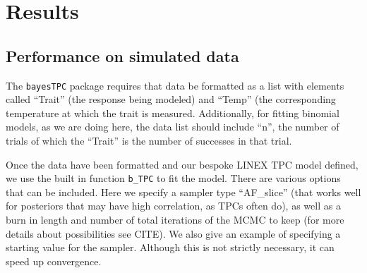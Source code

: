 \documentclass[
]{article}
\newenvironment{Shaded}{\begin{snugshade}}{\end{snugshade}}
\newcommand{\AttributeTok}[1]{\textcolor[rgb]{0.40,0.45,0.13}{#1}}
\newcommand{\FunctionTok}[1]{\textcolor[rgb]{0.28,0.35,0.67}{#1}}
\newcommand{\NormalTok}[1]{\textcolor[rgb]{0.00,0.23,0.31}{#1}}
\newcommand{\OtherTok}[1]{\textcolor[rgb]{0.00,0.23,0.31}{#1}}
\newcommand{\SpecialCharTok}[1]{\textcolor[rgb]{0.37,0.37,0.37}{#1}}
\begin{document}
\section{Results}\label{results}

\subsection{Performance on simulated
data}\label{performance-on-simulated-data}

The \texttt{bayesTPC} package requires that data be formatted as a list
with elements called ``Trait'' (the response being modeled) and ``Temp''
(the corresponding temperature at which the trait is measured.
Additionally, for fitting binomial models, as we are doing here, the
data list should include ``n'', the number of trials of which the
``Trait'' is the number of successes in that trial.

\begin{Shaded}
\end{Shaded}

Once the data have been formatted and our bespoke LINEX TPC model
defined, we use the built in function \texttt{b\_TPC} to fit the model.
There are various options that can be included. Here we specify a
sampler type ``AF\_slice'' (that works well for posteriors that may have
high correlation, as TPCs often do), as well as a burn in length and
number of total iterations of the MCMC to keep (for more details about
possibilities see CITE). We also give an example of specifying a
starting value for the sampler. Although this is not strictly necessary,
it can speed up convergence.
\end{document}
